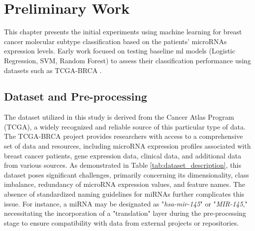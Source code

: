 
%
\chapter{Preliminary Work}

This chapter presents the initial experiments using machine learning for breast
cancer molecular subtype classification based on the patients’ microRNAs
expression levels. Early work focused on testing baseline \gls{ml} models
(Logistic Regression, SVM, Random Forest) to assess their classification
performance using datasets such as TCGA-BRCA \cite{TCGA_BRCA}.

\section{Dataset and Pre-processing}
The dataset utilized in this study is derived from the Cancer Atlas Program
(TCGA), a widely recognized and reliable source of this particular type of
data. The TCGA-BRCA project provides researchers with access to a comprehensive
set of data and resources, including microRNA expression profiles associated
with breast cancer patients, gene expression data, clinical data, and
additional data from various sources. As demonstrated in Table
\ref{tab:dataset_description}, this dataset poses significant challenges,
primarily concerning its dimensionality, class imbalance, redundancy of
microRNA expression values, and feature names. The absence of standardized
naming guidelines for miRNAs further complicates this issue. For instance, a
miRNA may be designated as "\textit{hsa-mir-145}" or "\textit{MIR-145},"
necessitating the incorporation of a "translation" layer during the
pre-processing stage to ensure compatibility with data from external projects
or repositories.

